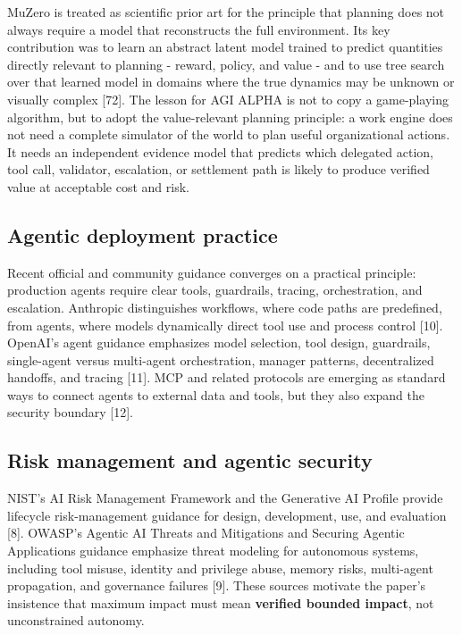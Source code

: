 MuZero is treated as scientific prior art for the principle that
planning does not always require a model that reconstructs the full
environment. Its key contribution was to learn an abstract latent model
trained to predict quantities directly relevant to planning - reward,
policy, and value - and to use tree search over that learned model in
domains where the true dynamics may be unknown or visually complex
{[}72{]}. The lesson for AGI ALPHA is not to copy a game-playing
algorithm, but to adopt the value-relevant planning principle: a work
engine does not need a complete simulator of the world to plan useful
organizational actions. It needs an independent evidence model that
predicts which delegated action, tool call, validator, escalation, or
settlement path is likely to produce verified value at acceptable cost
and risk.

\subsection{Agentic deployment
practice}\label{agentic-deployment-practice}

Recent official and community guidance converges on a practical
principle: production agents require clear tools, guardrails, tracing,
orchestration, and escalation. Anthropic distinguishes workflows, where
code paths are predefined, from agents, where models dynamically direct
tool use and process control {[}10{]}. OpenAI's agent guidance
emphasizes model selection, tool design, guardrails, single-agent versus
multi-agent orchestration, manager patterns, decentralized handoffs, and
tracing {[}11{]}. MCP and related protocols are emerging as standard
ways to connect agents to external data and tools, but they also expand
the security boundary {[}12{]}.

\subsection{Risk management and agentic
security}\label{risk-management-and-agentic-security}

NIST's AI Risk Management Framework and the Generative AI Profile
provide lifecycle risk-management guidance for design, development, use,
and evaluation {[}8{]}. OWASP's Agentic AI Threats and Mitigations and
Securing Agentic Applications guidance emphasize threat modeling for
autonomous systems, including tool misuse, identity and privilege abuse,
memory risks, multi-agent propagation, and governance failures {[}9{]}.
These sources motivate the paper's insistence that maximum impact must
mean \textbf{verified bounded impact}, not unconstrained autonomy.

